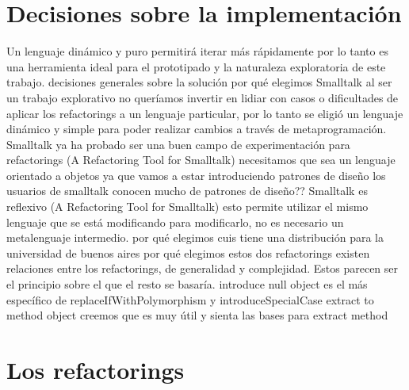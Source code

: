 \section{Decisiones sobre la implementación}
Un lenguaje dinámico y puro permitirá iterar más rápidamente por lo tanto es una herramienta ideal
para el prototipado y la naturaleza exploratoria de este trabajo.
decisiones generales sobre la solución
    por qué elegimos Smalltalk
    al ser un trabajo explorativo no queríamos invertir en lidiar con casos o dificultades de aplicar los refactorings a un lenguaje particular, por lo tanto se eligió un lenguaje dinámico y simple para poder realizar cambios a través de metaprogramación. Smalltalk ya ha probado ser una buen campo de experimentación para refactorings (A Refactoring Tool for Smalltalk)
        necesitamos que sea un lenguaje orientado a objetos ya que vamos a estar introduciendo patrones de diseño
        los usuarios de smalltalk conocen mucho de patrones de diseño??
        Smalltalk es reflexivo
        (A Refactoring Tool for Smalltalk) esto permite utilizar el mismo lenguaje que se está modificando para modificarlo, no es necesario un metalenguaje intermedio.
    por qué elegimos cuis
        tiene una distribución para la universidad de buenos aires
    por qué elegimos estos dos refactorings
    existen relaciones entre los refactorings, de generalidad y complejidad. Estos parecen ser el principio sobre el que el resto se basaría.
        introduce null object
        es el más específico de replaceIfWithPolymorphism y introduceSpecialCase
        extract to method object
        creemos que es muy útil y sienta las bases para extract method




\section{Los refactorings}

